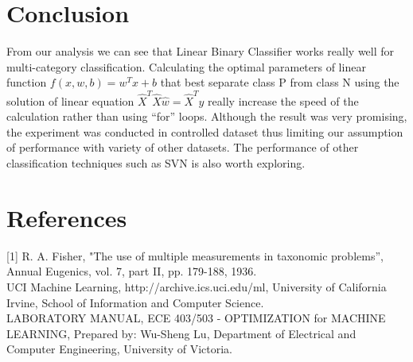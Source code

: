 \section{Conclusion}
\label{sect:conclusion}
From our analysis we can see that Linear Binary Classifier works really well for multi-category classification. Calculating the optimal parameters of linear function $f(x,w,b)=w^Tx+b$ that best separate class P from class N using the solution of linear equation $\hat{X}^T\hat{X}\hat{w}=\hat{X}^Ty$ really increase the speed of the calculation rather than using ``for'' loops. Although the result was very promising, the experiment was conducted in controlled dataset thus limiting our assumption of performance with variety of other datasets. The performance of other classification techniques such as SVN is also worth exploring.  

\section{References}
[1] R. A. Fisher, "The use of multiple measurements in taxonomic problems”, Annual Eugenics,
vol. 7, part II, pp. 179-188, 1936. \\\relax
[2] UCI Machine Learning, http://archive.ics.uci.edu/ml, University of California Irvine, School of
Information and Computer Science. \\\relax
[3] LABORATORY MANUAL, ECE 403/503 - OPTIMIZATION for MACHINE LEARNING, Prepared by: Wu-Sheng Lu, Department of Electrical and Computer Engineering, University of Victoria.
   